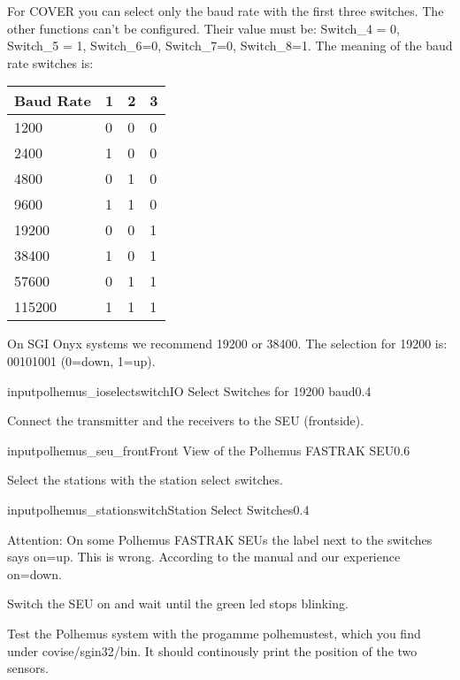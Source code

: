 For COVER you can select only the baud rate with the first three
switches. The other functions can't be configured. Their value must be:
Switch\_4 = 0, Switch\_5 = 1, Switch\_6=0, Switch\_7=0, Switch\_8=1.
The meaning of the baud rate switches is:
\begin{longtable}{|p{2cm}|p{1cm}|p{1cm}|p{1cm}|}
\hline
\bf{Baud Rate} & \bf{1} & \bf{2} & \bf{3}\\
\hline\hline
1200  &  0 & 0 & 0 \\
\hline
2400  &  1 & 0 & 0   \\
\hline
4800  &  0 & 1 & 0   \\
\hline
9600  &  1 & 1 & 0   \\
\hline
19200  &  0 & 0 & 1   \\
\hline
38400  &  1 & 0 & 1   \\
\hline
57600  &  0 & 1 & 1   \\
\hline
115200  &  1 & 1 & 1   \\
\hline
\end{longtable}

On SGI Onyx systems we recommend 19200 or 38400.
The selection for 19200 is: 00101001 (0=down, 1=up).

\begin{covimg}{input}{polhemus_ioselectswitch}{IO Select Switches for 19200 baud}{0.4}\end{covimg}

Connect the transmitter and the receivers to the SEU (frontside). 

\begin{covimg}{input}{polhemus_seu_front}{Front View of the Polhemus FASTRAK SEU}{0.6}\end{covimg}

Select the stations with the station select switches. 

\begin{covimg}{input}{polhemus_stationswitch}{Station Select Switches}{0.4}\end{covimg}

\begin{em}Attention: On some Polhemus FASTRAK SEUs the label next to the switches
says on=up. This is wrong. According to the manual and our experience
on=down.
\end{em}


Switch the SEU on and wait until the green led stops blinking.

Test the Polhemus system with the progamme polhemustest, which you find
under covise/sgin32/bin. It should continously print the position of the two sensors.

